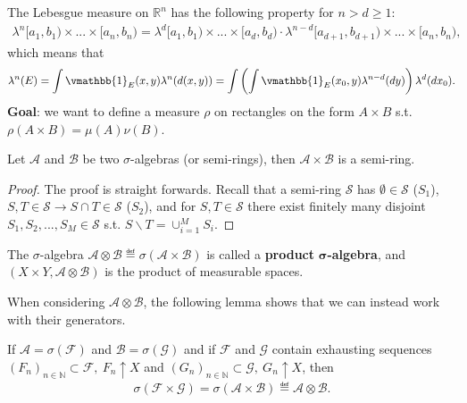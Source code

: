 The Lebesgue measure on \(\mathbb{R}^n\) has the following property for \(n>d\geq1\):
\begin{align*}
    \lambda^n[a_1,b_1) \times  ... \times [a_n, b_n) = 
    \lambda^d[a_1,b_1) \times  ... \times [a_d, b_d) \cdot 
    \lambda^{n-d}[a_{d+1}, b_{d+1})  \times  ... \times [a_n, b_n),
\end{align*}
which means that
\begin{align*}
    \lambda^n(E) = 
    \int\vmathbb{1}_{E}(x,y)\lambda^n(d(x,y))=
    \int\left(\int \vmathbb{1}_{E}(x_0,y)\lambda^{n-d}(dy)\right) \lambda^d(dx_0).
\end{align*}
\textbf{Goal}: we want to define a measure \(\rho\) on rectangles on the form \(A\times B\) s.t. \(\rho(A\times B)=\mu(A)\nu(B)\).
\begin{lemma}
    Let \(\mathscr{A}\) and \(\mathscr{B}\) be two \(\sigma\)-algebras (or semi-rings), then \(\mathscr{A}\times\mathscr{B}\) is a semi-ring.
\end{lemma}
\ifdetailed
\begin{proof}
    The proof is straight forwards. Recall that a semi-ring \(\mathcal{S}\) has \(\emptyset\in\mathcal{S}\) (\(S_1\)), \(S,T\in \mathcal{S}\rightarrow S\cap T\in\mathcal{S}\) (\(S_2\)), and for \(S,T\in\mathcal{S}\) there exist finitely many disjoint \(S_1, S_2, ..., S_M\in\mathcal{S}\) s.t. \(S\backslash T = \cup_{i=1}^{M}S_i\).
\end{proof}
\fi
\begin{definition}
    The \(\sigma\)-algebra \(\mathscr{A}\otimes \mathscr{B}\eqdef \sigma\left(\mathscr{A}\times \mathscr{B}\right)\) is called a \textbf{product} \(\boldsymbol{\sigma}\)\textbf{-algebra}, and \(\left(X\times Y, \mathscr{A}\otimes\mathscr{B}\right)\) is the product of measurable spaces.
\end{definition}
When considering \(\mathscr{A}\otimes\mathscr{B}\), the following lemma shows that we can instead work with their generators.
\begin{lemma}   \label{lemma:generator_product_sigma}
    If \(\mathscr{A}=\sigma(\mathscr{F})\) and \(\mathscr{B}=\sigma(\mathscr{G})\) and if \(\mathscr{F}\) and \(\mathscr{G}\) contain exhausting sequences \((F_n)_{n\in\mathbb{N}}\subset \mathscr{F}, \ F_n\uparrow X\) and \((G_n)_{n\in\mathbb{N}}\subset \mathscr{G}, \ G_n\uparrow X\), then
    \begin{align*}
        \sigma\left(\mathscr{F}\times \mathscr{G}\right) = \sigma\left(\mathscr{A}\times\mathscr{B}\right) \eqdef \mathscr{A}\otimes\mathscr{B}.
    \end{align*}
\end{lemma}
